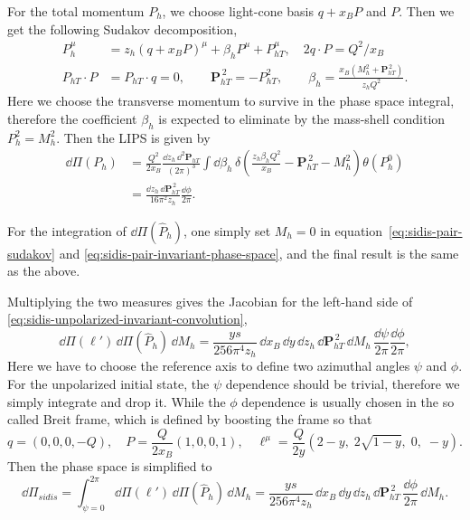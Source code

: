 \documentclass[a4paper,11pt]{article}
\begin{document}
For the total momentum $P_h$, we choose light-cone basis $q+x_BP$ and $P$. Then we get the following Sudakov decomposition,
\begin{equation}
    \begin{aligned}
        P_h^\mu&=z_h(q+x_BP)^\mu+\beta_h P^\mu+P_{hT}^\mu,\quad 2q\cdot P = Q^2/x_B\\
        P_{hT}\cdot P&=P_{hT}\cdot q=0,\qquad
        \bm P_{hT}^{\,2}=-P_{hT}^2,\qquad
        \beta_h=\frac{x_B(M_h^2+\bm P_{hT}^{\,2})}{z_hQ^2}.
    \end{aligned}
    \label{eq:sidis-pair-sudakov}
\end{equation}
Here we choose the transverse momentum to survive in the phase space integral, therefore the coefficient $\beta_h$ is expected to eliminate by the mass-shell condition $P_h^2=M_h^2$.
Then the LIPS is given by
\begin{equation}
    \begin{aligned}
        \dd\Pi(P_h)
        &=\frac{Q^2}{2x_B}\frac{\dd z_h\,\dd^2\bm P_{hT}}{(2\pi)^3}
          \int\dd\beta_h\,
          \delta\left(\frac{z_h\beta_h Q^2}{x_B}-\bm P_{hT}^{\,2}-M_h^2\right)
          \theta(P_h^0)\\
        &=\frac{\dd z_h\,\dd\bm P_{hT}^{\,2}}{16\pi^2z_h}
          \frac{\dd\phi}{2\pi}.
    \end{aligned}
    \label{eq:sidis-pair-invariant-phase-space}
\end{equation}

For the integration of $\dd\Pi(\hat P_h)$, one simply set $M_h=0$ in equation~\eqref{eq:sidis-pair-sudakov} and \eqref{eq:sidis-pair-invariant-phase-space}, and the final result is the same as the above.

Multiplying the two measures gives the Jacobian for the left-hand
side of \eqref{eq:sidis-unpolarized-invariant-convolution},
\begin{equation}
    \dd\Pi(\ell')\,\dd\Pi(\hat P_h)\,\dd M_h
    =\frac{ys}{256\pi^4 z_h}\,
    \dd x_B\,\dd y\,\dd z_h\,\dd\bm P_{hT}^{\,2}\,\dd M_h\,
    \frac{\dd\psi}{2\pi}\frac{\dd\phi}{2\pi},
\end{equation}
Here we have to choose the reference axis to define two azimuthal angles $\psi$ and $\phi$. For the unpolarized initial state, the $\psi$ dependence should be trivial, therefore we simply integrate and drop it.
While the $\phi$ dependence is usually chosen in the so called Breit frame, which is defined by boosting the frame so that
$$
q = (0,0,0,-Q), \quad P = \frac{Q}{2x_B}(1,0,0,1), \quad \ell^\mu = \frac{Q}{2y}\left(2 - y,\; 2\sqrt{1 - y},\; 0,\; -y\right).
$$
Then the phase space is simplified to
\begin{equation}
    \dd\Pi_{sidis}=\int_{\psi=0}^{2\pi}
    \dd\Pi(\ell')\,\dd\Pi(\hat P_h)\,\dd M_h
    =\frac{ys}{256\pi^4 z_h}\,
    \dd x_B\,\dd y\,\dd z_h\,\dd\bm P_{hT}^{\,2}\,
    \frac{\dd\phi}{2\pi}\,\dd M_h.
    \label{eq:sidis-reduced-phase-space}
\end{equation}
\end{document}
